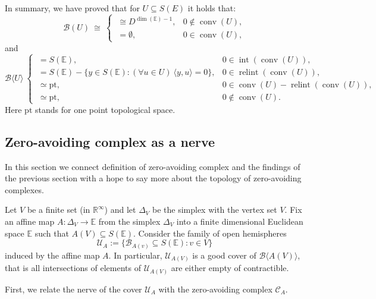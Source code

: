 \documentclass[a4paper,11pt,reqno, english]{amsart}
\theoremstyle{definition}
\theoremstyle{remark}
\newcommand\R{\mathbb R}
\newcommand\U{\mathscr U}
\newcommand\CC{\mathscr C}
\newcommand\E{\mathbb{E}}
\newcommand\pt{\mathrm{pt}}
\DeclareMathOperator{\interior}{\mathrm{int}}
\DeclareMathOperator{\relint}{\mathrm{relint}}
\DeclareMathOperator{\conv}{\mathrm{conv}}
\begin{document}
\medskip
In summary, we have proved that for $U\subseteq S(E)$ it holds that:
\[
	\mathscr{B}(U)\ \cong \
	\begin{cases}
		\ \cong D^{\dim(\E)-1}, & 0\notin\conv(U), \\
		\ = \emptyset,          & 0\in\conv(U),
	\end{cases}
\]
and
\begin{equation}
	\label{eq : 00}
	\mathscr{B}\langle U\rangle\
	\begin{cases}
		\ =S(\E),                                                           & 0\in\interior (\conv(U)),            \\
		\ =S(\E)-\{y\in S(\E) : (\forall u\in U)\ \langle y,u\rangle=0 \} , & 0\in \relint (\conv (U)),            \\
		\ \simeq \pt,                                                       & 0\in \conv (U) - \relint(\conv (U)), \\
		\ \simeq \pt,                                                       & 0\notin  \conv (U).
	\end{cases}
\end{equation}
Here $\pt$ stands for one point topological space.

\medskip
\subsection{Zero-avoiding complex as a nerve}

In this section we connect definition of zero-avoiding complex and the findings of the previous section with a hope to say more about the topology of zero-avoiding complexes.


\medskip
Let $V$ be a finite set (in $\R^{\infty}$) and let $\Delta_V$ be the simplex with the vertex set $V$.
Fix an affine map $A\colon \Delta_V\longrightarrow\E$ from the simplex $\Delta_V$ into a finite dimensional Euclidean space $\E$ such that $A(V)\subseteq S(\E)$.
Consider the family of open hemispheres
\[\U_A:=\{\mathscr{B}_{A(v)} \subseteq S(\E) : v \in V\}\]
induced by the affine map $A$.
In particular,  $\U_{A(V)}$ is a good cover of $\mathscr{B}\langle A(V)\rangle$, that is all intersections of elements of  $\U_{A(V)}$ are either empty of contractible.


\medskip
First, we relate the nerve of the cover $\U_A$ with the zero-avoiding complex $\CC_A$.
\end{document}
